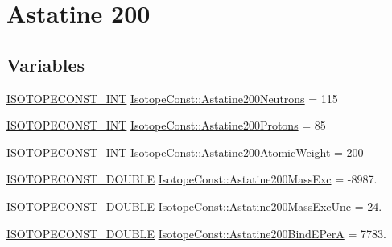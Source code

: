 \hypertarget{group___isotope_const-_astatine-_at200}{}\section{Astatine 200}
\label{group___isotope_const-_astatine-_at200}
\subsection*{Variables}
\begin{DoxyCompactItemize}
\item 
\mbox{\hyperlink{group___isotope_const-_macros_ga5f18360b3e99483a35c32d789e62621c}{I\+S\+O\+T\+O\+P\+E\+C\+O\+N\+S\+T\+\_\+\+I\+NT}} \mbox{\hyperlink{group___isotope_const-_astatine-_at200_gaa9753fd3d3848531b3cbd2726ab3f3dc}{Isotope\+Const\+::\+Astatine200\+Neutrons}} = 115
\item 
\mbox{\hyperlink{group___isotope_const-_macros_ga5f18360b3e99483a35c32d789e62621c}{I\+S\+O\+T\+O\+P\+E\+C\+O\+N\+S\+T\+\_\+\+I\+NT}} \mbox{\hyperlink{group___isotope_const-_astatine-_at200_ga8716dd55f1e9fc5bfbae2bfd063cb623}{Isotope\+Const\+::\+Astatine200\+Protons}} = 85
\item 
\mbox{\hyperlink{group___isotope_const-_macros_ga5f18360b3e99483a35c32d789e62621c}{I\+S\+O\+T\+O\+P\+E\+C\+O\+N\+S\+T\+\_\+\+I\+NT}} \mbox{\hyperlink{group___isotope_const-_astatine-_at200_ga77fa331627c86dab95a2f221e4392bde}{Isotope\+Const\+::\+Astatine200\+Atomic\+Weight}} = 200
\item 
\mbox{\hyperlink{group___isotope_const-_macros_ga8f45a7272ce02c0b4c65c44636ed719a}{I\+S\+O\+T\+O\+P\+E\+C\+O\+N\+S\+T\+\_\+\+D\+O\+U\+B\+LE}} \mbox{\hyperlink{group___isotope_const-_astatine-_at200_ga70655242348c5e0c808f79a9cff44990}{Isotope\+Const\+::\+Astatine200\+Mass\+Exc}} = -\/8987.
\item 
\mbox{\hyperlink{group___isotope_const-_macros_ga8f45a7272ce02c0b4c65c44636ed719a}{I\+S\+O\+T\+O\+P\+E\+C\+O\+N\+S\+T\+\_\+\+D\+O\+U\+B\+LE}} \mbox{\hyperlink{group___isotope_const-_astatine-_at200_ga81624c8e678e99f90e316fc8692c50a1}{Isotope\+Const\+::\+Astatine200\+Mass\+Exc\+Unc}} = 24.
\item 
\mbox{\hyperlink{group___isotope_const-_macros_ga8f45a7272ce02c0b4c65c44636ed719a}{I\+S\+O\+T\+O\+P\+E\+C\+O\+N\+S\+T\+\_\+\+D\+O\+U\+B\+LE}} \mbox{\hyperlink{group___isotope_const-_astatine-_at200_gad28e6f92a1a9858a0065d0b9dd27ff86}{Isotope\+Const\+::\+Astatine200\+Bind\+E\+PerA}} = 7783.
\item 

\end{DoxyCompactItemize}
